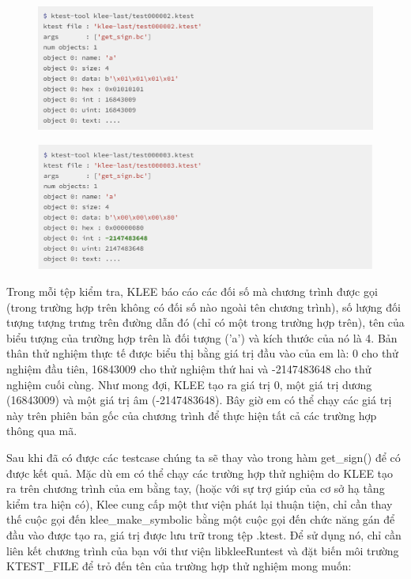 \documentclass[12pt,a4paper]{report}
\begin{document}
\begin{figure}[ht]
\begin{center}
\includegraphics[scale=0.25]{hinhanh/test2.png}
\end{center}
\end{figure}

\begin{figure}[ht]
\begin{center}
\includegraphics[scale=0.25]{hinhanh/test3.png}
\end{center}
\end{figure}

Trong mỗi tệp kiểm tra, KLEE báo cáo các đối số mà chương trình được gọi (trong trường hợp trên không có đối số nào ngoài tên chương trình), số lượng đối tượng tượng trưng trên đường dẫn đó (chỉ có một trong trường hợp trên), tên của biểu tượng của trường hợp trên là đối tượng ('a') và kích thước của nó là 4. Bản thân thử nghiệm thực tế được biểu thị bằng giá trị đầu vào của em là: 0 cho thử nghiệm đầu tiên, 16843009 cho thử nghiệm thứ hai và -2147483648 cho thử nghiệm cuối cùng. Như mong đợi, KLEE tạo ra giá trị 0, một giá trị dương (16843009) và một giá trị âm (-2147483648). Bây giờ em có thể chạy các giá trị này trên phiên bản gốc của chương trình để thực hiện tất cả các trường hợp thông qua mã.

Sau khi đã có được các testcase chúng ta sẽ thay vào trong hàm get\_sign() để có được kết quả. Mặc dù em có thể chạy các trường hợp thử nghiệm do KLEE tạo ra trên chương trình của em bằng tay, (hoặc với sự trợ giúp của cơ sở hạ tầng kiểm tra hiện có), Klee cung cấp một thư viện phát lại thuận tiện, chỉ cần thay thế cuộc gọi đến klee\_make\_symbolic bằng một cuộc gọi đến chức năng gán để đầu vào được tạo ra, giá trị được lưu trữ trong tệp .ktest. Để sử dụng nó, chỉ cần liên kết chương trình của bạn với thư viện libkleeRuntest và đặt biến môi trường KTEST\_FILE để trỏ đến tên của trường hợp thử nghiệm mong muốn:
\end{document}
